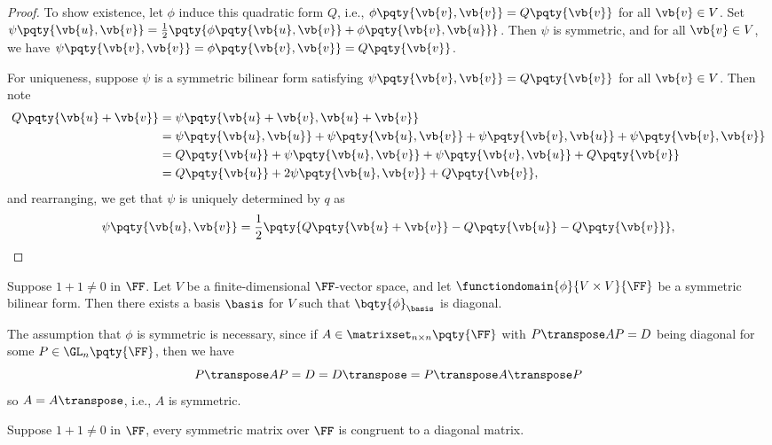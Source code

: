 \begin{proof}
    To show existence, let \(\phi\) induce this quadratic form \(Q\), i.e., \(\phi\pqty{\vb{v}, \vb{v}} = Q\pqty{\vb{v}}\) for all \(\vb{v} \in V\). Set \(\psi\pqty{\vb{u}, \vb{v}} = \frac{1}{2} \pqty{\phi\pqty{\vb{u}, \vb{v}} + \phi\pqty{\vb{v}, \vb{u}}}\). Then \(\psi\) is symmetric, and for all \(\vb{v} \in V\), we have \(\psi\pqty{\vb{v}, \vb{v}} = \phi\pqty{\vb{v}, \vb{v}} = Q\pqty{\vb{v}}\).

    For uniqueness, suppose \(\psi\) is a symmetric bilinear form satisfying \(\psi\pqty{\vb{v}, \vb{v}} = Q\pqty{\vb{v}}\) for all \(\vb{v} \in V\). Then note 
    \begin{align*}
        Q\pqty{\vb{u} + \vb{v}} &= \psi\pqty{\vb{u} + \vb{v}, \vb{u} + \vb{v}} \\
        &= \psi\pqty{\vb{u}, \vb{u}} + \psi\pqty{\vb{u}, \vb{v}} + \psi\pqty{\vb{v}, \vb{u}} + \psi\pqty{\vb{v}, \vb{v}} \\
        &= Q\pqty{\vb{u}} + \psi\pqty{\vb{u}, \vb{v}} + \psi\pqty{\vb{v}, \vb{u}} + Q\pqty{\vb{v}} \\
        &= Q\pqty{\vb{u}} + 2 \psi\pqty{\vb{u}, \vb{v}} + Q\pqty{\vb{v}},
    \end{align*}
    and rearranging, we get that \(\psi\) is uniquely determined by \(q\) as
    \[
        \psi\pqty{\vb{u}, \vb{v}} = \frac{1}{2} \pqty{Q\pqty{\vb{u} + \vb{v}} - Q\pqty{\vb{u}} - Q\pqty{\vb{v}}},
    \]
\end{proof}

\begin{theorem}
    \label{thm:diagonalisation-symmetric-bilinear-forms}%
    Suppose \(1 + 1 \neq 0\) in \(\FF\). Let \(V\) be a finite-dimensional \(\FF\)-vector space, and let \(\functiondomain{\phi}{V \times V}{\FF}\) be a symmetric bilinear form. Then there exists a basis \(\basis\) for \(V\) such that \(\bqty{\phi}_{\basis}\) is diagonal.
\end{theorem}

\begin{remark}
    The assumption that \(\phi\) is symmetric is necessary, since if \(A \in \matrixset_{n \times n} \pqty{\FF}\) with \(P \transpose A P = D\) being diagonal for some \(P \in \GL_n\pqty{\FF}\), then we have
    \[
        P\transpose A P = D = D\transpose = P\transpose A\transpose P
    \]
    so \(A = A\transpose\), i.e., \(A\) is symmetric.
\end{remark}

\begin{corollary}
    Suppose \(1 + 1 \neq 0\) in \(\FF\), every symmetric matrix over \(\FF\) is congruent to a diagonal matrix.
\end{corollary}

